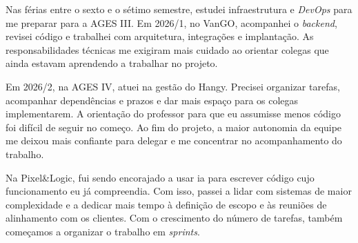 Nas férias entre o sexto e o sétimo semestre, estudei infraestrutura e
\textit{DevOps} para me preparar para a AGES III. Em 2026/1, no VanGO,
acompanhei o \textit{backend}, revisei código e trabalhei com arquitetura,
integrações e implantação. As responsabilidades técnicas me exigiram mais
cuidado ao orientar colegas que ainda estavam aprendendo a trabalhar no
projeto.

Em 2026/2, na AGES IV, atuei na gestão do Hangy. Precisei organizar tarefas,
acompanhar dependências e prazos e dar mais espaço para os colegas
implementarem. A orientação do professor para que eu assumisse menos
código foi difícil de seguir no começo. Ao fim do projeto, a maior autonomia
da equipe me deixou mais confiante para delegar e me concentrar no
acompanhamento do trabalho.

Na Pixel\&Logic, fui sendo encorajado a usar \ac{ia} para escrever código cujo
funcionamento eu já compreendia. Com isso, passei a lidar com sistemas de
maior complexidade e a dedicar mais tempo à definição de escopo e às
reuniões de alinhamento com os clientes. Com o crescimento do número de
tarefas, também começamos a organizar o trabalho em \textit{sprints}.
